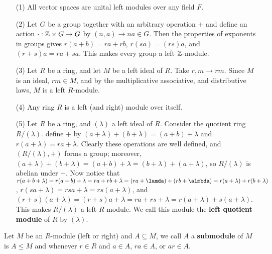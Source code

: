 \begin{example}
    \begin{enumerate}
        \item[(1)] All vector spaces are unital left modules over any field $F$.		

        \item[(2)] Let $G$ be a group together with an arbitrary operation  $+$ and define an action
            $\cdot:\mathbb{Z} \times G \rightarrow G$ by $(n,a) \rightarrow na \in G$. Then the properties
            of exponents in groups gives $r(a+b)=ra+rb$, $r(sa)=(rs)a$, and $(r+s)a=ra+sa$. This
            makes every group a left $\mathbb{Z}$-module.

        \item[(3)] Let $R$ be a ring, and let  $M$ be a left ideal of  $R$. Take  $r,m \rightarrow
            rm$. Since $M$ is an ideal,  $rm \in M$, and by the multiplicative associative, and
            distributive laws, $M$ is a left $R$-module.

        \item[(4)] Any ring $R$ is a left  (and right) module over itself.

        \item[(5)] Let $R$ be a ring, and  $(\lambda)$ a left ideal of $R$. Consider the quotient
            ring  $R/(\lambda)$. define $+$ by  $(a+\lambda)+(b+\lambda)=(a+b)+\lambda$ and
            $r(a+\lambda)=ra+\lambda$. Clearly these operations are well defined, and
            $(R/(\lambda),+)$ forms a group; moreover,
            $(a+\lambda)+(b+\lambda)=(a+b)+\lambda=(b+\lambda)+(a+\lambda)$, so $R/(\lambda)$ is
            abelian under $+$. Now notice that
            $r(a+b+\lambda)=r(a+b)+\lambda=ra+rb+\lambda=(ra+\lamda)+(rb+\almbda)=r(a+\lambda)+r(b+\lambda)$,
            $r(sa+\lambda)=rsa+\lambda=rs(a+\lambda)$, and
            $(r+s)(a+\lambda)=(r+s)a+\lambda=ra+rs+\lambda=r(a+\lambda)+s(a+\lambda)$. This makes
            $R/(\lambda)$ a left $R$-module. We call this module the  \textbf{left quotient module}
            of $R$ by  $(\lambda)$.
    \end{enumerate}
\end{example} 

\begin{definition}
    Let $M$ be an  $R$-module  (left or right) and $A \subseteq M$, we call  $A$ a
    \textbf{submodule} of $M$ is  $A \leq M$ and whenever  $r \in R$ and  $a \in A$,  $ra \in A$, or
    $ar \in A$.
\end{definition}

